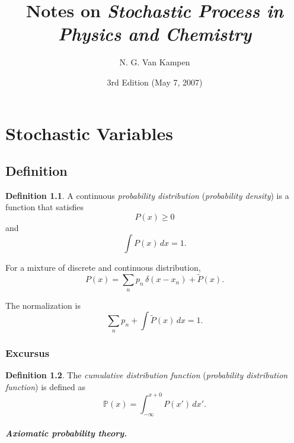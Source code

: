 \documentclass{book}
\numberwithin{equation}{section}
\theoremstyle{plain}
\theoremstyle{definition}
\newtheorem{defn}{Definition}[section]
\theoremstyle{remark}
\theoremstyle{BoldStyle}
\numberwithin{exercise}{section}
\begin{document}
\title{Notes on \emph{Stochastic Process in Physics and Chemistry}\cite{vankampen}}
\author{N. G. Van Kampen}
\date{3rd Edition (May 7, 2007)}

\maketitle

\tableofcontents


\chapter{Stochastic Variables}

\section{Definition}

\begin{defn}
  A continuous \emph{probability distribution}
  (\emph{probability density}) is a function
  that satisfies
  \begin{equation}
    P(x) \ge 0
    \label{eq:Px_nonneg}
  \end{equation}
  and
  \begin{equation}
    \int P(x) \, dx = 1.
    \label{eq:Px_normalize}
  \end{equation}
\end{defn}

For a mixture of discrete and continuous distribution,
\begin{equation}
  P(x) = \sum_n p_n \, \delta(x - x_n) + \tilde P(x).
  \label{eq:Px_mixture}
\end{equation}

The normalization is
$$
\sum_{n} p_n + \int \tilde P(x) \, dx = 1.
$$

\subsection*{Excursus}

\begin{defn}
  The \emph{cumulative distribution function}
  (\emph{probability distribution function})
  is defined as
  \begin{equation}
    \mathbb{P}(x) = \int_{-\infty}^{x+0} P(x') \, dx'.
  \end{equation}
\end{defn}

\paragraph{Axiomatic probability theory.}
\end{document}
